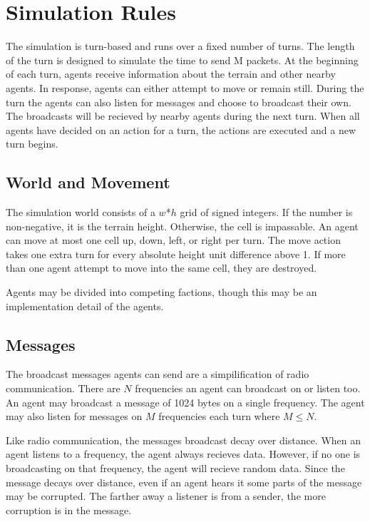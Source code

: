 \section{Simulation Rules}
\label{rules}

The simulation is turn-based and runs over a fixed number of turns. The length of the turn is designed to simulate the time to send M packets. At the beginning of each turn, agents receive information about the terrain and other nearby agents. In response, agents can either attempt to move or remain still. During the turn the agents can also listen for messages and choose to broadcast their own. The broadcasts will be recieved by nearby agents during the next turn. When all agents have decided on an action for a turn, the actions are executed and a new turn begins.

\subsection{World and Movement}

The simulation world consists of a $w$*$h$ grid of signed integers. If the number is non-negative, it is the terrain height. Otherwise, the cell is impassable. An agent can move at most one cell up, down, left, or right per turn. The move action takes one extra turn for every absolute height unit difference above 1. If more than one agent attempt to move into the same cell, they are destroyed.

Agents may be divided into competing factions, though this may be an implementation detail of the agents.

\subsection{Messages}

The broadcast messages agents can send are a simpilification of radio communication. There are $N$ frequencies an agent can broadcast on or listen too. An agent may broadcast a message of 1024 bytes on a single frequency. The agent may also listen for messages on $M$ frequencies each turn where $M \leq N$.

Like radio communication, the messages broadcast decay over distance. When an agent listens to a frequency, the agent always recieves data. However, if no one is broadcasting on that frequency, the agent will recieve random data. Since the message decays over distance, even if an agent hears it some parts of the message may be corrupted. The farther away a listener is from a sender, the more corruption is in the message.


